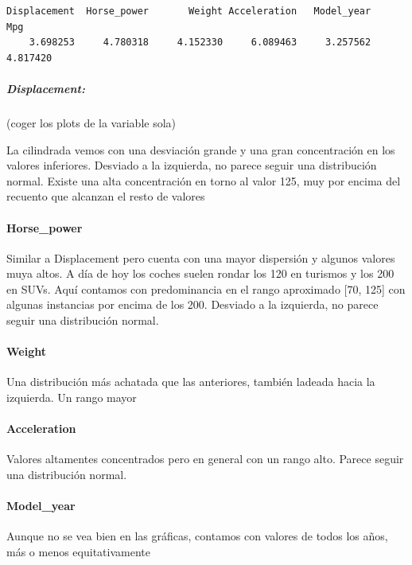 \documentclass[
]{article}
\begin{document}
\begin{verbatim}
Displacement  Horse_power       Weight Acceleration   Model_year          Mpg 
    3.698253     4.780318     4.152330     6.089463     3.257562     4.817420 
\end{verbatim}

\hypertarget{displacement}{%
\subparagraph{Displacement:}\label{displacement}}

(coger los plots de la variable sola)

La cilindrada vemos con una desviación grande y una gran concentración
en los valores inferiores. Desviado a la izquierda, no parece seguir una
distribución normal. Existe una alta concentración en torno al valor
125, muy por encima del recuento que alcanzan el resto de valores

\hypertarget{horse_power}{%
\paragraph{Horse\_power}\label{horse_power}}

Similar a Displacement pero cuenta con una mayor dispersión y algunos
valores muya altos. A día de hoy los coches suelen rondar los 120 en
turismos y los 200 en SUVs. Aquí contamos con predominancia en el rango
aproximado {[}70, 125{]} con algunas instancias por encima de los 200.
Desviado a la izquierda, no parece seguir una distribución normal.

\hypertarget{weight}{%
\paragraph{Weight}\label{weight}}

Una distribución más achatada que las anteriores, también ladeada hacia
la izquierda. Un rango mayor

\hypertarget{acceleration}{%
\paragraph{Acceleration}\label{acceleration}}

Valores altamentes concentrados pero en general con un rango alto.
Parece seguir una distribución normal.

\hypertarget{model_year}{%
\paragraph{Model\_year}\label{model_year}}

Aunque no se vea bien en las gráficas, contamos con valores de todos los
años, más o menos equitativamente
\end{document}
